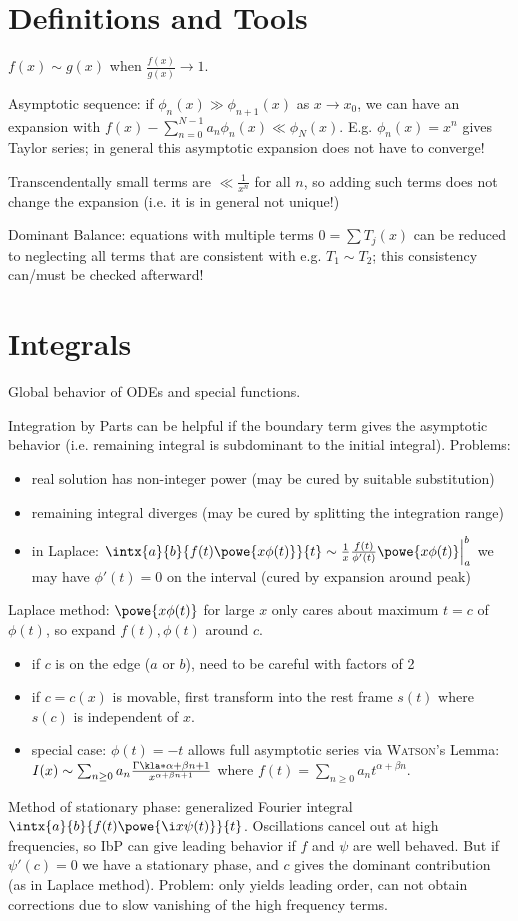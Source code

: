 \documentclass[english, parskip=full]{scrbook}
\begin{document}
\section{Definitions and Tools}
$f(x)\sim g(x)$ when $\frac{f(x)}{g(x)} \rightarrow 1$.

Asymptotic sequence: if $\phi_n(x) \gg \phi_{n+1}(x)$ as $x\rightarrow x_0$, we can have an expansion with $f(x)-\sum_{n=0}^{N-1} a_n \phi_n(x) \ll \phi_N(x)$.
E.g. $\phi_n(x)=x^n$ gives Taylor series; in general this asymptotic expansion does not have to converge!

Transcendentally small terms are $\ll \frac{1}{x^n}$ for all $n$, so adding such terms does not change the expansion (i.e. it is in general not unique!)

Dominant Balance: equations with multiple terms $0=\sum T_j(x)$ can be reduced to neglecting all terms that are consistent with e.g. $T_1\sim T_2$; this consistency can/must be checked afterward!
\section{Integrals}
Global behavior of ODEs and special functions.

Integration by Parts can be helpful if the boundary term gives the asymptotic behavior (i.e. remaining integral is subdominant to the initial integral).
Problems:
\begin{itemize}
\item real solution has non-integer power (may be cured by suitable substitution)
\item remaining integral diverges (may be cured by splitting the integration range)
\item in Laplace: $\intx{a}{b}{f(t) \powe{x\phi(t)}}{t} \sim \frac{1}{x} \frac{f(t)}{\phi'(t)} \powe{x\phi(t)} \Big\vert_a^b$ we may have $\phi'(t)=0$ on the interval (cured by expansion around peak)
\end{itemize}
Laplace method: $\powe{x\phi(t)}$ for large $x$ only cares about maximum $t=c$ of $\phi(t)$, so expand $f(t),\phi(t)$ around $c$.
\begin{itemize}
\item if $c$ is on the edge ($a$ or $b$), need to be careful with factors of 2
\item if $c=c(x)$ is movable, first transform into the rest frame $s(t)$ where $s(c)$ is independent of $x$.
\item special case: $\phi(t)=-t$ allows full asymptotic series via \textsc{Watson}'s Lemma: $I(x)\sim \sum_{n\ge 0} a_n \frac{\Gamma\kla*{\alpha + \beta n + 1}}{x^{\alpha+\beta n + 1}}$ where $f(t) = \sum_{n\ge 0} a_n t^{\alpha + \beta n}$.
\end{itemize}
Method of stationary phase: generalized Fourier integral $\intx{a}{b}{f(t) \powe{\i x\psi(t)}}{t}$.
Oscillations cancel out at high frequencies, so IbP can give leading behavior if $f$ and $\psi$ are well behaved.
But if $\psi'(c)=0$ we have a stationary phase, and $c$ gives the dominant contribution (as in Laplace method).
Problem: only yields leading order, can not obtain corrections due to slow vanishing of the high frequency terms.
\end{document}
